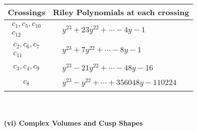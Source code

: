 \documentclass[1p]{elsarticle_modified}
\theoremstyle{definition}
\begin{document}
\begin{tabular}{m{50pt}|m{274pt}}
Crossings & \hspace{64pt}Riley Polynomials at each crossing \\
\hline $$\begin{aligned}c_{1},c_{5},c_{10}\\c_{12}\end{aligned}$$&$\begin{aligned}
&y^{23}+23 y^{22}+\cdots-4 y-1
\end{aligned}$\\
\hline $$\begin{aligned}c_{2},c_{6},c_{7}\\c_{11}\end{aligned}$$&$\begin{aligned}
&y^{23}+7 y^{22}+\cdots-8 y-1
\end{aligned}$\\
\hline $$\begin{aligned}c_{3},c_{4},c_{9}\end{aligned}$$&$\begin{aligned}
&y^{23}-21 y^{22}+\cdots-48 y-16
\end{aligned}$\\
\hline $$\begin{aligned}c_{8}\end{aligned}$$&$\begin{aligned}
&y^{23}- y^{22}+\cdots+356048 y-110224
\end{aligned}$\\
\hline
\end{tabular}\\~\\
\newpage\flushleft \textbf{(vi) Complex Volumes and Cusp Shapes}
\end{document}
